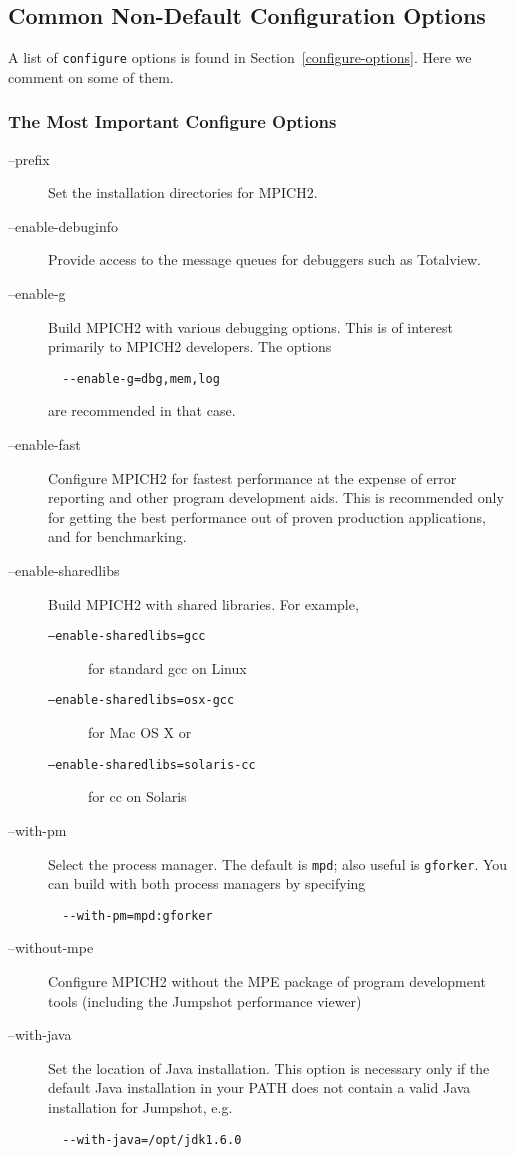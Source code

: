 \documentclass[dvipdfm,11pt]{article}
\begin{document}
\subsection{Common Non-Default Configuration Options}
\label{sec:non-default}

A list of \texttt{configure} options is found in
Section~\ref{configure-options}.  Here we comment on some of them.  

\subsubsection{The Most Important Configure Options}
\label{sec:important-configure-options}
\begin{description}
\item[--prefix]Set the installation directories for MPICH2.  
\item[--enable-debuginfo]Provide access to the message queues for
  debuggers such as Totalview.
\item[--enable-g]Build MPICH2 with various debugging options.  This is
  of interest primarily to MPICH2 developers.  The options
\begin{verbatim}
  --enable-g=dbg,mem,log
\end{verbatim}
 are recommended in that case.
\item[--enable-fast]Configure MPICH2 for fastest performance at the
  expense of error reporting and other program development aids.  This
  is recommended only for getting the best performance out of proven
  production applications, and for benchmarking.
\item[--enable-sharedlibs]Build MPICH2 with shared libraries. 
  For example, 
\begin{description}
\item[\texttt{--enable-sharedlibs=gcc}]for standard gcc on Linux  
\item[\texttt{--enable-sharedlibs=osx-gcc}]for Mac OS X or
\item[\texttt{--enable-sharedlibs=solaris-cc}]for cc on Solaris
\end{description}
\item[--with-pm]Select the process manager.  The default is
  \texttt{mpd}; also useful is \texttt{gforker}.  You can build with
  both process managers by specifying
\begin{verbatim}
  --with-pm=mpd:gforker
\end{verbatim}
\item[--without-mpe]Configure MPICH2 without the MPE package of
  program development tools (including the Jumpshot performance viewer)
\item[--with-java]Set the location of Java installation.  This option
is necessary only if the default Java installation in your PATH does
not contain a valid Java installation for Jumpshot, e.g.
\begin{verbatim}
  --with-java=/opt/jdk1.6.0
\end{verbatim}
\end{description}
\end{document}
